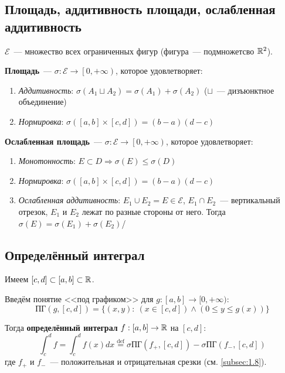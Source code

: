 \documentclass[../main.tex]{subfiles}
\begin{document}
\subsection{Площадь, аддитивность площади, ослабленная аддитивность}
$\mathcal{E}$~--- множество всех ограниченных фигур (фигура~--- подмножетсво $\mathbb{R}^2$).

\textbf{Площадь}~--- $\sigma:\mathcal{E}\to\left[0,+\infty\right)$, которое удовлетворяет:
\begin{enumerate}
    \item \textit{Аддитивность}: $\sigma(A_1 \sqcup A_2)=\sigma(A_1)+\sigma(A_2)$ ($\sqcup$~--- дизъюнктное объединение)
    \item \textit{Нормировка}: $\sigma([a,b]\times[c,d])=(b-a)(d-c)$
\end{enumerate}

\textbf{Ослабленная площадь}~--- $\sigma:\mathcal{E}\to\left[0,+\infty\right)$, которое удовлетворяет:
\begin{enumerate}
    \item \textit{Монотонность}: $E \subset D \Rightarrow \sigma(E)\le\sigma(D)$
    \item \textit{Нормировка}: $\sigma([a,b]\times[c,d])=(b-a)(d-c)$
    \item \textit{Ослабленная аддитивность}: $E_1 \cup E_2 = E \in \mathcal{E}$,
    $E_1 \cap E_2$~--- вертикальный отрезок, $E_1$ и $E_2$ лежат по разные стороны от него.
    Тогда $\sigma(E)=\sigma(E_1)+\sigma(E_2)$/
\end{enumerate}

\subsection{Определённый интеграл}
Имеем $[c,d]\subset[a,b]\subset\mathbb{R}$.

Введём понятие <<под графиком>> для $g:[a,b]\to[0,+\infty)$:
\begin{equation*}
    \text{ПГ}(g,[c,d])=\{(x,y):\ (x\in[c,d]) \land (0 \le y \le g(x))\}
\end{equation*}

Тогда \textbf{определённый интеграл} $f:[a,b]\to\mathbb{R}$ на $[c,d]$:
\begin{equation*}
    \int_c^d f = \int_c^d f(x)dx \overset{\text{def}}{=}\sigma\text{ПГ}(f_+,[c,d])-\sigma\text{ПГ}(f_-,[c,d])
\end{equation*}
где $f_+$ и $f_-$~--- положительная и отрицательная срезки (см. \ref{subsec:1.8}).
\newpage
\end{document}
